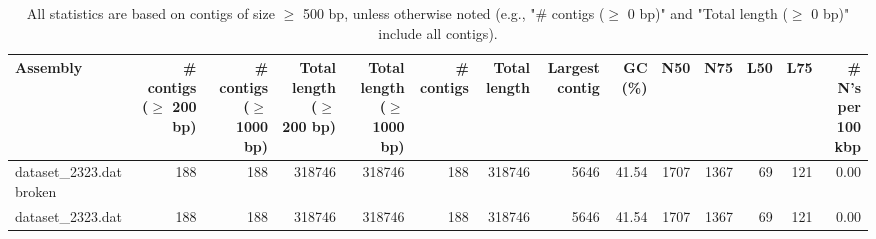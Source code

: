 \documentclass[12pt,a4paper]{article}
\begin{document}
\begin{table}[ht]
\begin{center}
\caption{All statistics are based on contigs of size $\geq$ 500 bp, unless otherwise noted (e.g., "\# contigs ($\geq$ 0 bp)" and "Total length ($\geq$ 0 bp)" include all contigs).}
\begin{tabular}{|l*{13}{|r}|}
\hline
Assembly & \# contigs ($\geq$ 200 bp) & \# contigs ($\geq$ 1000 bp) & Total length ($\geq$ 200 bp) & Total length ($\geq$ 1000 bp) & \# contigs & Total length & Largest contig & GC (\%) & N50 & N75 & L50 & L75 & \# N's per 100 kbp \\ \hline
dataset\_2323.dat broken & 188 & 188 & 318746 & 318746 & 188 & 318746 & 5646 & 41.54 & 1707 & 1367 & 69 & 121 & 0.00 \\ \hline
dataset\_2323.dat & 188 & 188 & 318746 & 318746 & 188 & 318746 & 5646 & 41.54 & 1707 & 1367 & 69 & 121 & 0.00 \\ \hline
\end{tabular}
\end{center}
\end{table}
\end{document}
